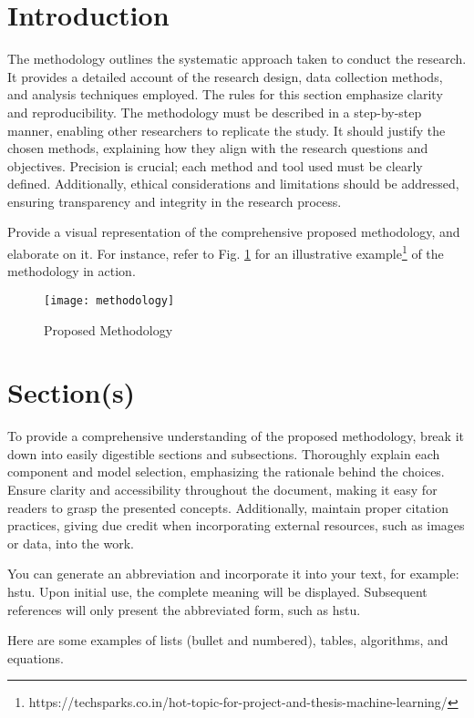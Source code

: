 % 
\section{Introduction}
\label{methodology:introduction}
%
The methodology outlines the systematic approach taken to conduct the research. It provides a detailed account of the research design, data collection methods, and analysis techniques employed. The rules for this section emphasize clarity and reproducibility. The methodology must be described in a step-by-step manner, enabling other researchers to replicate the study. It should justify the chosen methods, explaining how they align with the research questions and objectives. Precision is crucial; each method and tool used must be clearly defined. Additionally, ethical considerations and limitations should be addressed, ensuring transparency and integrity in the research process.

Provide a visual representation of the comprehensive proposed methodology, and elaborate on it. For instance, refer to Fig. \ref{figure:methodology} for an illustrative example\footnote{https://techsparks.co.in/hot-topic-for-project-and-thesis-machine-learning/} of the methodology in action.

\begin{figure}[H]
\centering
\texttt{[image: methodology]}
\caption{Proposed Methodology}
\label{figure:methodology}
\end{figure}


%
\section{Section(s)}
\label{methodology:section}
%
To provide a comprehensive understanding of the proposed methodology, break it down into easily digestible sections and subsections. Thoroughly explain each component and model selection, emphasizing the rationale behind the choices. Ensure clarity and accessibility throughout the document, making it easy for readers to grasp the presented concepts. Additionally, maintain proper citation practices, giving due credit when incorporating external resources, such as images or data, into the work.

You can generate an abbreviation and incorporate it into your text, for example: \gls{hstu}. Upon initial use, the complete meaning will be displayed. Subsequent references will only present the abbreviated form, such as \gls{hstu}.

Here are some examples of lists (bullet and numbered), tables, algorithms, and equations.

